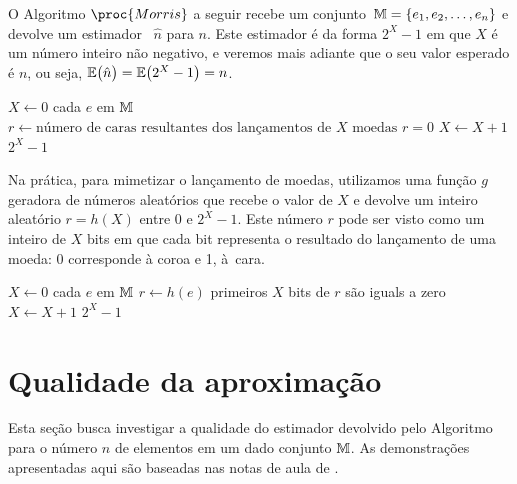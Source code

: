 O Algoritmo $\proc{Morris}$ a seguir recebe um conjunto~$\mathbb{M} = \{ e_1, e_2, \dots, e_n \}$ e devolve um estimador~
$\hat{n}$ para $n$. Este estimador é da forma $2^{X} - 1$ em que $X$ é um número inteiro não negativo, e veremos mais 
adiante que o seu valor esperado é $n$, ou seja, $\mathbb{E}\big(\hat{n}\big) = \mathbb{E}\big(2^{X} - 1\big) = n$.

\begin{codebox}
  \li $X \gets 0$
  \li \For cada $e$ em $\mathbb{M}$ 
  \li \Do
      $r \gets \text{número de caras resultantes dos lançamentos de $X$ moedas}$ 
  \li   \If $r = 0$
  \li   \Do
          $X \gets X + 1$
        \End
      \End
  \li
  \Return $2^{X} - 1$   
  \End
\end{codebox}

Na prática, para mimetizar o lançamento de moedas, utilizamos uma função $g$ geradora de números aleatórios que recebe o
valor de $X$ e devolve um inteiro aleatório $r = h(X)$ entre 0 e $2^{X} - 1$. Este número $r$ pode ser visto como um 
inteiro de $X$ bits em que cada bit representa o resultado do lançamento de uma moeda: 0 corresponde à coroa e 1, 
à~cara. 

\begin{codebox}
  \li $X \gets 0$                                         \label{li:morris:init}
  \li \For cada $e$ em $\mathbb{M}$                             \label{li:morris:for:start}
  \li \Do
      $r \gets h(e)$                                      \label{li:morris:generator}
  \li   \If primeiros $X$ bits de $r$ são iguals a zero   \label{li:morris:increment:condition}
  \li   \Do
          $X \gets X + 1$
        \End
      \End                                                \label{li:morris:end}
  \li
  \Return $2^{X} - 1$   
  \End
\end{codebox}
\newcommand{\morrisfor}{\ref{li:morris:for:start}--\ref{li:morris:end}}

\section{Qualidade da aproximação}
\label{sec:morris:analysis}
\newcommand{\morrisestimator}{\proc{Morris}(\Mbb)}

Esta seção busca investigar a qualidade do estimador devolvido pelo Algoritmo  para o número $n$ de 
elementos em um dado conjunto $\mathbb{M}$. As demonstrações apresentadas aqui são baseadas nas notas de aula de 
\citep{LectureNotesAndoni}.

